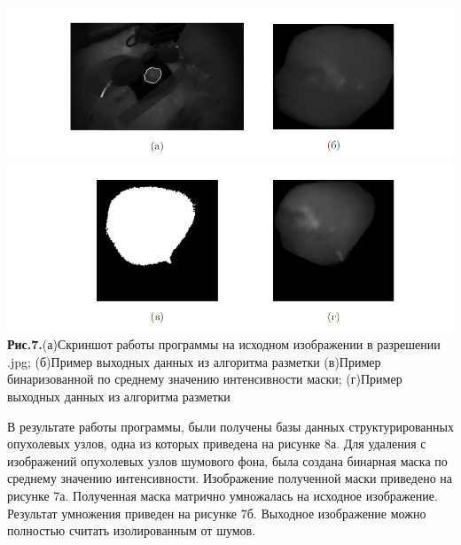 \documentclass[a4paper,14pt]{extarticle}
\begin{document}
\begin{center}
    \includegraphics[scale = 0.85]{ab.PNG}
    \includegraphics[scale = 0.85]{vg.PNG}
    \textbf{Рис.7.}(а)Скриншот работы программы на исходном изображении в разрешении .jpg; (б)Пример выходных данных из алгоритма разметки (в)Пример бинаризованной по среднему значению интенсивности маски; (г)Пример выходных данных из алгоритма разметки 
\end{center}

В результате работы программы, были получены базы данных структурированных опухолевых узлов, одна из которых приведена на рисунке 8а. Для удаления с изображений опухолевых узлов шумового фона, была создана бинарная маска по среднему значению интенсивности. Изображение полученной маски приведено на рисунке 7а. Полученная маска матрично умножалась на исходное изображение. Результат умножения приведен на рисунке 7б. Выходное изображение можно полностью считать изолированным от шумов.
\end{document}
